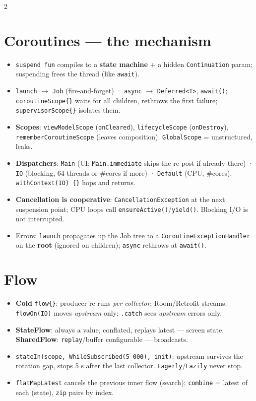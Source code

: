\documentclass[8pt]{extarticle}
\begin{document}
\begin{multicols}{2}
\raggedright

\section{Coroutines — the mechanism}
\begin{itemize}\raggedright
  \item \texttt{suspend fun} compiles to a \textbf{state machine} + a hidden
        \texttt{Continuation} param; suspending frees the thread (like \texttt{await}).
  \item \texttt{launch} $\to$ \texttt{Job} (fire-and-forget) · \texttt{async} $\to$
        \texttt{Deferred<T>}, \texttt{await()}; \texttt{coroutineScope\{\}} waits for all
        children, rethrows the first failure; \texttt{supervisorScope\{\}} isolates them.
  \item \textbf{Scopes}: \texttt{viewModelScope} (\texttt{onCleared}),
        \texttt{lifecycleScope} (\texttt{onDestroy}), \texttt{rememberCoroutineScope}
        (leaves composition). \texttt{GlobalScope} = unstructured, leaks.
  \item \textbf{Dispatchers}: \texttt{Main} (UI; \texttt{Main.immediate} skips the re-post
        if already there) · \texttt{IO} (blocking, 64 threads or \#cores if more) ·
        \texttt{Default} (CPU, \#cores). \texttt{withContext(IO) \{\}} hops and returns.
  \item \textbf{Cancellation is cooperative}: \texttt{CancellationException} at the next
        suspension point; CPU loops call \texttt{ensureActive()}/\texttt{yield()}.
        Blocking I/O is not interrupted.
  \item Errors: \texttt{launch} propagates up the Job tree to a
        \texttt{CoroutineExceptionHandler} on the \textbf{root} (ignored on children);
        \texttt{async} rethrows at \texttt{await()}.
\end{itemize}

\section{Flow}
\begin{itemize}\raggedright
  \item \textbf{Cold} \texttt{flow\{\}}: producer re-runs \emph{per collector}; Room/Retrofit
        streams. \texttt{flowOn(IO)} moves \emph{upstream} only; \texttt{.catch} sees
        \emph{upstream} errors only.
  \item \textbf{StateFlow}: always a value, conflated, replays latest — screen state.
        \textbf{SharedFlow}: \texttt{replay}/buffer configurable — broadcasts.
  \item \texttt{stateIn(scope, WhileSubscribed(5\_000), init)}: upstream survives the
        rotation gap, stops 5 s after the last collector. \texttt{Eagerly}/\texttt{Lazily}
        never stop.
  \item \texttt{flatMapLatest} cancels the previous inner flow (search);
        \texttt{combine} = latest of each (state), \texttt{zip} pairs by index.
\end{itemize}


\end{multicols}
\end{document}
